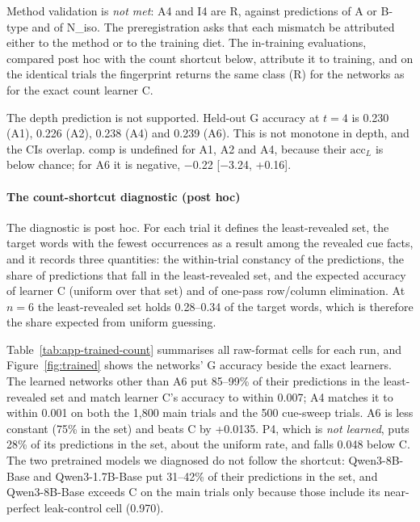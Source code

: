 \documentclass[11pt]{article}
\begin{document}
Method validation is \emph{not met}: A4 and I4 are R, against predictions of A or B-type and of N\_iso. The preregistration asks that each mismatch be attributed either to the method or to the training diet. The in-training evaluations, compared post hoc with the count shortcut below, attribute it to training, and on the identical trials the fingerprint returns the same class (R) for the networks as for the exact count learner C.

The depth prediction is not supported. Held-out G accuracy at $t = 4$ is 0.230 (A1), 0.226 (A2), 0.238 (A4) and 0.239 (A6). This is not monotone in depth, and the CIs overlap. comp is undefined for A1, A2 and A4, because their $\mathrm{acc}_L$ is below chance; for A6 it is negative, $-$0.22 [$-$3.24, +0.16].

\paragraph{The count-shortcut diagnostic (post hoc)}

The diagnostic is post hoc. For each trial it defines the least-revealed set, the target words with the fewest occurrences as a result among the revealed cue facts, and it records three quantities: the within-trial constancy of the predictions, the share of predictions that fall in the least-revealed set, and the expected accuracy of learner C (uniform over that set) and of one-pass row/column elimination. At $n = 6$ the least-revealed set holds 0.28--0.34 of the target words, which is therefore the share expected from uniform guessing.

Table~\ref{tab:app-trained-count} summarises all raw-format cells for each run, and Figure~\ref{fig:trained} shows the networks' G accuracy beside the exact learners. The learned networks other than A6 put 85--99\% of their predictions in the least-revealed set and match learner C's accuracy to within 0.007; A4 matches it to within 0.001 on both the 1,800 main trials and the 500 cue-sweep trials. A6 is less constant (75\% in the set) and beats C by +0.0135. P4, which is \emph{not learned}, puts 28\% of its predictions in the set, about the uniform rate, and falls 0.048 below C. The two pretrained models we diagnosed do not follow the shortcut: Qwen3-8B-Base and Qwen3-1.7B-Base put 31--42\% of their predictions in the set, and Qwen3-8B-Base exceeds C on the main trials only because those include its near-perfect leak-control cell (0.970).
\end{document}
